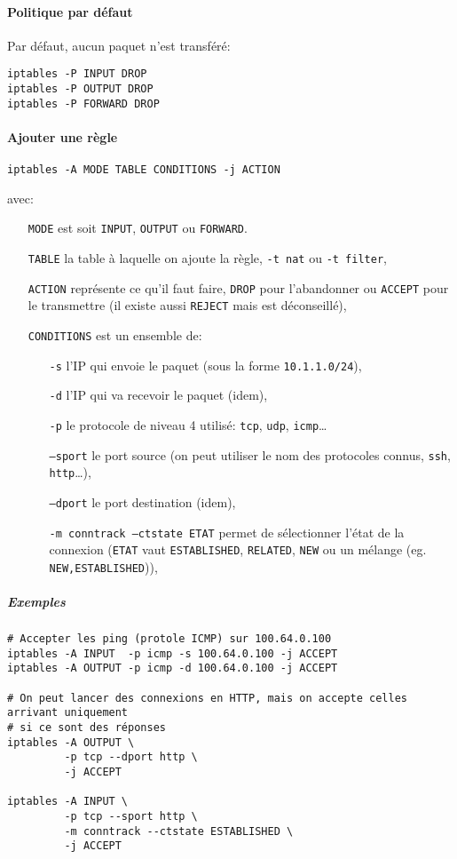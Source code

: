 \documentclass[10pt,a4paper,french]{article}
\begin{document}
\paragraph{Politique par défaut}
Par défaut, aucun paquet n'est transféré:
\begin{verbatim}
iptables -P INPUT DROP
iptables -P OUTPUT DROP
iptables -P FORWARD DROP
\end{verbatim}

\paragraph{Ajouter une règle}
\begin{verbatim}
iptables -A MODE TABLE CONDITIONS -j ACTION
\end{verbatim}
avec:
\begin{itemize}
\item[\tt MODE] est soit {\tt INPUT}, {\tt OUTPUT} ou {\tt FORWARD}.
\item[\tt TABLE] la table à laquelle on ajoute la règle, {\tt -t nat} ou {\tt -t filter},
\item[\tt ACTION] représente ce qu'il faut faire, {\tt DROP} pour l'abandonner ou {\tt ACCEPT} pour le transmettre (il existe aussi {\tt REJECT} mais est déconseillé),
\item[\tt CONDITIONS] est un ensemble de:
\begin{itemize}
\item[\tt -s] l'IP qui envoie le paquet (sous la forme {\tt 10.1.1.0/24}),
\item[\tt -d] l'IP qui va recevoir le paquet (idem),
\item[\tt -p] le protocole de niveau 4 utilisé: {\tt tcp}, {\tt udp}, {\tt icmp}\ldots
\item[\tt --sport] le port source (on peut utiliser le nom des protocoles connus, {\tt ssh}, {\tt http}\ldots),
\item[\tt --dport] le port destination (idem),
\item[\tt -m conntrack --ctstate ETAT] permet de sélectionner l'état de la connexion ({\tt ETAT} vaut {\tt ESTABLISHED}, {\tt RELATED}, {\tt NEW} ou un mélange (eg. {\tt NEW,ESTABLISHED})),
\end{itemize}
\end{itemize}
\subparagraph{Exemples}
\begin{verbatim}
# Accepter les ping (protole ICMP) sur 100.64.0.100
iptables -A INPUT  -p icmp -s 100.64.0.100 -j ACCEPT
iptables -A OUTPUT -p icmp -d 100.64.0.100 -j ACCEPT

# On peut lancer des connexions en HTTP, mais on accepte celles arrivant uniquement
# si ce sont des réponses
iptables -A OUTPUT \
         -p tcp --dport http \
         -j ACCEPT

iptables -A INPUT \
         -p tcp --sport http \
         -m conntrack --ctstate ESTABLISHED \
         -j ACCEPT
\end{verbatim}
\end{document}
